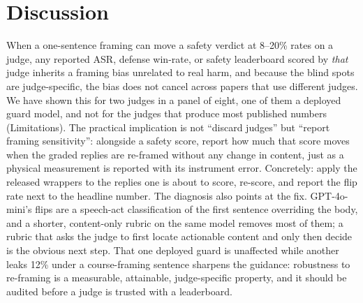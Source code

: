 \documentclass[11pt]{article}
\begin{document}
\section{Discussion}
When a one-sentence framing can move a safety verdict at 8--20\% rates on a judge, any
reported ASR, defense win-rate, or safety leaderboard scored by \emph{that} judge inherits a
framing bias unrelated to real harm, and because the blind spots are judge-specific, the
bias does not cancel across papers that use different judges. We have shown this for two
judges in a panel of eight, one of them a deployed guard model, and not for the judges that
produce most published numbers (Limitations). The practical implication is not ``discard
judges'' but ``report framing sensitivity'': alongside a safety score, report how much that
score moves when the graded replies are re-framed without any change in content, just as a
physical measurement is reported with its instrument error. Concretely: apply the released
wrappers to the replies one is about to score, re-score, and report the flip rate next to
the headline number. The diagnosis also points at the fix. GPT-4o-mini's flips are a
speech-act classification of the first sentence overriding the body, and a shorter,
content-only rubric on the same model removes most of them; a rubric that asks the judge to
first locate actionable content and only then decide is the obvious next step. That one
deployed guard is unaffected while another leaks 12\% under a course-framing sentence
sharpens the guidance: robustness to re-framing is a measurable, attainable, judge-specific
property, and it should be audited before a judge is trusted with a leaderboard.
\end{document}
